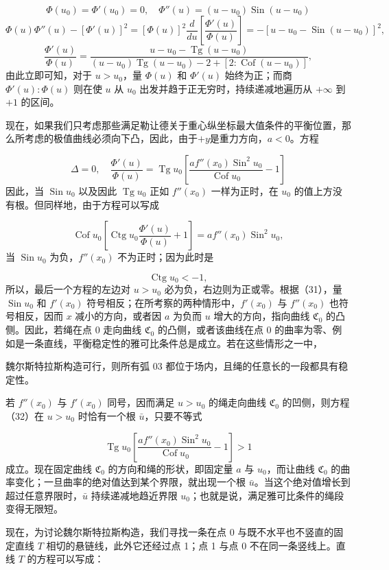 \documentclass[11pt,a4paper,leqno]{article}
\newcommand{\Cof}{\operatorname{Cof}}
\newcommand{\Sin}{\operatorname{Sin}}
\newcommand{\Tg}{\operatorname{Tg}}
\newcommand{\Ctg}{\operatorname{Ctg}}
\begin{document}
\[
\Phi(u_0)=\Phi'(u_0)=0,\quad \Phi''(u)=(u-u_0)\Sin(u-u_0)
\]
\[
\Phi(u)\Phi''(u)-[\Phi'(u)]^2=[\Phi(u)]^2\frac{d}{du}\left[\frac{\Phi'(u)}{\Phi(u)}\right]
= -[u-u_0-\Sin(u-u_0)]^2,
\]
\[
\frac{\Phi'(u)}{\Phi(u)}=\frac{u-u_0-\Tg(u-u_0)}{(u-u_0)\Tg(u-u_0)-2+[2:\Cof(u-u_0)]},
\]
由此立即可知，对于 $u>u_0$，量 $\Phi(u)$ 和 $\Phi'(u)$ 始终为正；而商 $\Phi'(u):\Phi(u)$ 则在使 $u$ 从 $u_0$ 出发并趋于正无穷时，持续递减地遍历从 $+\infty$ 到 $+1$ 的区间。

现在，如果我们只考虑那些满足勒让德关于重心纵坐标最大值条件的平衡位置，那么所考虑的极值曲线必须向下凸，因此，由于$+y$是重力方向，$a<0$。方程

\begin{equation}\tag{32}
\Delta=0,
\quad
\frac{\Phi'(u)}{\Phi(u)}=\Tg u_0\left[\frac{a f''(x_0)\Sin^2u_0}{\Cof u_0}-1\right]
\end{equation}
因此，当 $\Sin u_0$ 以及因此 $\Tg u_0$ 正如 $f''(x_0)$ 一样为正时，在 $u_0$ 的值上方没有根。但同样地，由于方程可以写成

\[
\Cof u_0\left[\Ctg u_0\frac{\Phi'(u)}{\Phi(u)}+1\right]=a f''(x_0)\Sin^2u_0,
\]
当 $\Sin u_0$ 为负，$f''(x_0)$ 不为正时；因为此时是

\[
\Ctg u_0<-1,
\]
所以，最后一个方程的左边对 $u>u_0$ 必为负，右边则为正或零。根据（31），量 $\Sin u_0$ 和 $f'(x_0)$ 符号相反；在所考察的两种情形中，$f'(x_0)$ 与 $f''(x_0)$ 也符号相反，因而 $x$ 减小的方向，或者因 $a$ 为负而 $u$ 增大的方向，指向曲线 $\mathfrak{C}_0$ 的凸侧。因此，若绳在点 0 走向曲线 $\mathfrak{C}_0$ 的凸侧，或者该曲线在点 0 的曲率为零、例如是一条直线，平衡稳定性的雅可比条件总是成立。若在这些情形之一中，

魏尔斯特拉斯构造可行，则所有弧 03 都位于场内，且绳的任意长的一段都具有稳定性。

若 $f''(x_0)$ 与 $f'(x_0)$ 同号，因而满足 $u>u_0$ 的绳走向曲线 $\mathfrak{C}_0$ 的凹侧，则方程（32）在 $u>u_0$ 时恰有一个根 $\bar u$，只要不等式

\[
\Tg u_0\left[\frac{a f''(x_0)\Sin^2u_0}{\Cof u_0}-1\right]>1
\]
成立。现在固定曲线 $\mathfrak{C}_0$ 的方向和绳的形状，即固定量 $a$ 与 $u_0$，而让曲线 $\mathfrak{C}_0$ 的曲率变化；一旦曲率的绝对值达到某个界限，就出现一个根 $\bar u$。当这个绝对值增长到超过任意界限时，$\bar u$ 持续递减地趋近界限 $u_0$；也就是说，满足雅可比条件的绳段变得无限短。

现在，为讨论魏尔斯特拉斯构造，我们寻找一条在点 0 与既不水平也不竖直的固定直线 $T$ 相切的悬链线，此外它还经过点 1；点 1 与点 0 不在同一条竖线上。直线 $T$ 的方程可以写成：
\end{document}
